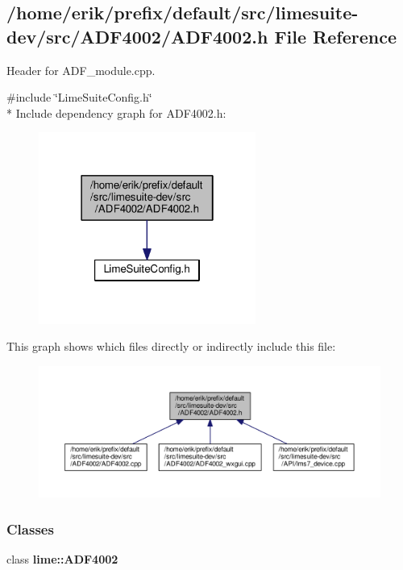 \subsection{/home/erik/prefix/default/src/limesuite-\/dev/src/\+A\+D\+F4002/\+A\+D\+F4002.h File Reference}
\label{ADF4002_8h}


Header for A\+D\+F\+\_\+module.\+cpp.  


{\ttfamily \#include \char`\"{}Lime\+Suite\+Config.\+h\char`\"{}}\\*
Include dependency graph for A\+D\+F4002.\+h\+:
\nopagebreak
\begin{figure}[H]
\begin{center}
\leavevmode
\includegraphics[width=202pt]{d7/df6/ADF4002_8h__incl}
\end{center}
\end{figure}
This graph shows which files directly or indirectly include this file\+:
\nopagebreak
\begin{figure}[H]
\begin{center}
\leavevmode
\includegraphics[width=350pt]{d5/d2d/ADF4002_8h__dep__incl}
\end{center}
\end{figure}
\subsubsection*{Classes}
\begin{DoxyCompactItemize}
\item 
class {\bf lime\+::\+A\+D\+F4002}
\end{DoxyCompactItemize}
